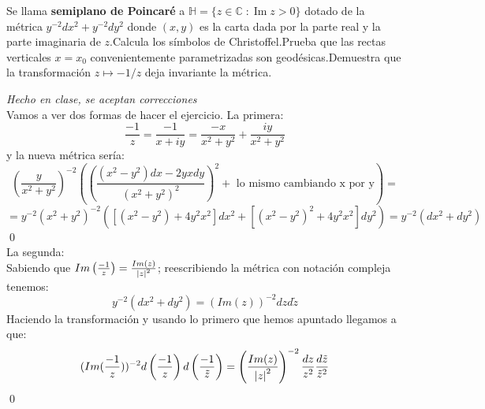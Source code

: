 \begin{problem}[16] Se llama \textbf{semiplano de Poincaré} a $\mathbb{H}=\{z\in\mathbb{C}\;:\; \text{Im}\; z>0\}$ dotado de la métrica $y^{-2}dx^2+y^{-2}dy^2$ donde $(x,y)$ es la carta dada por la parte real y la parte imaginaria de $z$.\ppart Calcula los símbolos de Christoffel.\ppart Prueba que las rectas verticales $x=x_0$ convenientemente parametrizadas son geodésicas.\ppart Demuestra que la transformación $z\mapsto -1/z$ deja invariante la métrica. 
	
	\solution\textit{Hecho en clase, se aceptan correcciones}\\ \spart \spart \spart Vamos a ver dos formas de hacer el ejercicio. La primera:\\ $$\frac{-1}{z}=\frac{-1}{x+iy}=\frac{-x}{x^2+y^2}+\frac{iy}{x^2+y^2}$$ y la nueva métrica sería: $$\left(\frac{y}{x^2+y^2}\right)^{-2}\left(\left(\frac{(x^2-y^2)dx-2yxdy}{(x^2+y^2)^2}\right)^2+\text{ lo mismo cambiando x por y}\right)=$$
	$$=y^{-2}(x^2+y^2)^{-2}\left([(x^2-y^2)+4y^2x^2]dx^2+[(x^2-y^2)^2+4y^2x^2]dy^2\right)=y^{-2}(dx^2+dy^2)$$\qed\\
	La segunda:\\
	Sabiendo que $Im\left(\frac{-1}{z}\right)=\frac{Im(z)}{\abs{z}^2}$; reescribiendo la métrica con notación compleja tenemos:$$y^{-2}(dx^2+dy^2)=(Im(z))^{-2}dzd\tilde{z}$$Haciendo la transformación y usando lo primero que hemos apuntado llegamos a que: $$(Im(\frac{-1}{z}))^{-2}d\left(\frac{-1}{z}\right)d\left(\frac{-1}{\tilde{z}}\right)=\left(\frac{Im(z)}{\abs{z}^2}\right)^{-2}\frac{dz}{z^2}\frac{d\tilde{z}}{\tilde{z}^2}$$\qed
	
\end{problem}

